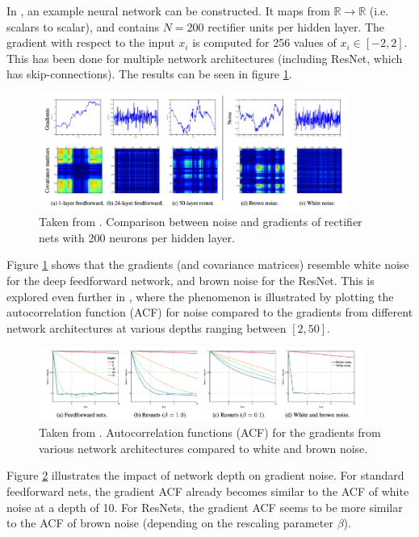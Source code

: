 In \cite{balduzzi2017}, an example neural network can be constructed. It maps from $\mathbb{R} \rightarrow \mathbb{R}$ (i.e. scalars to scalar), and contains $N=200$ rectifier units per hidden layer. The gradient with respect to the input $x_i$ is computed for 256 values of $x_i \in [-2,2]$. This has been done for multiple network architectures (including ResNet, which has skip-connections). The results can be seen in figure \ref{fig:balduzzi-gradients}.
\begin{figure}[H]
    \centering
    \includegraphics[width=0.90\textwidth]{figures/balduzzi-gradients.png}
    \caption{Taken from \cite{balduzzi2017}. Comparison between noise and gradients of rectifier nets with 200 neurons per hidden layer.}
    \label{fig:balduzzi-gradients}
\end{figure}

Figure \ref{fig:balduzzi-gradients} shows that the gradients (and covariance matrices) resemble white noise for the deep feedforward network, and brown noise for the ResNet. This is explored even further in \cite{balduzzi2017}, where the phenomenon is illustrated by plotting the autocorrelation function (ACF) for noise compared to the gradients from different network architectures at various depths ranging between $[2,50]$.
\begin{figure}[H]
    \centering
    \includegraphics[width=0.95\textwidth]{figures/balduzzi-acf.png}
    \caption{Taken from \cite{balduzzi2017}. Autocorrelation functions (ACF) for the gradients from various network architectures compared to white and brown noise.}
    \label{fig:balduzzi-acf}
\end{figure}

Figure \ref{fig:balduzzi-acf} illustrates the impact of network depth on gradient noise. For standard feedforward nets, the gradient ACF already becomes similar to the ACF of white noise at a depth of 10. For ResNets, the gradient ACF seems to be more similar to the ACF of brown noise (depending on the rescaling parameter $\beta$).


